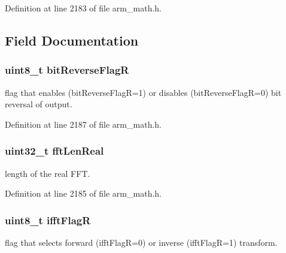 Definition at line 2183 of file arm\+\_\+math.\+h.



\subsection{Field Documentation}
\subsubsection[{\texorpdfstring{bit\+Reverse\+FlagR}{bitReverseFlagR}}]{\setlength{\rightskip}{0pt plus 5cm}uint8\+\_\+t bit\+Reverse\+FlagR}\hypertarget{structarm__rfft__instance__q31_ad56ec2425e2422108b8767b43d944591}{}\label{structarm__rfft__instance__q31_ad56ec2425e2422108b8767b43d944591}
flag that enables (bit\+Reverse\+FlagR=1) or disables (bit\+Reverse\+FlagR=0) bit reversal of output. 

Definition at line 2187 of file arm\+\_\+math.\+h.

\subsubsection[{\texorpdfstring{fft\+Len\+Real}{fftLenReal}}]{\setlength{\rightskip}{0pt plus 5cm}uint32\+\_\+t fft\+Len\+Real}\hypertarget{structarm__rfft__instance__q31_adf0d4604cf5546075d9d4cf122d6c986}{}\label{structarm__rfft__instance__q31_adf0d4604cf5546075d9d4cf122d6c986}
length of the real F\+FT. 

Definition at line 2185 of file arm\+\_\+math.\+h.

\subsubsection[{\texorpdfstring{ifft\+FlagR}{ifftFlagR}}]{\setlength{\rightskip}{0pt plus 5cm}uint8\+\_\+t ifft\+FlagR}\hypertarget{structarm__rfft__instance__q31_a787d72055c89e4d62b188d6bd646341c}{}\label{structarm__rfft__instance__q31_a787d72055c89e4d62b188d6bd646341c}
flag that selects forward (ifft\+FlagR=0) or inverse (ifft\+FlagR=1) transform. 

